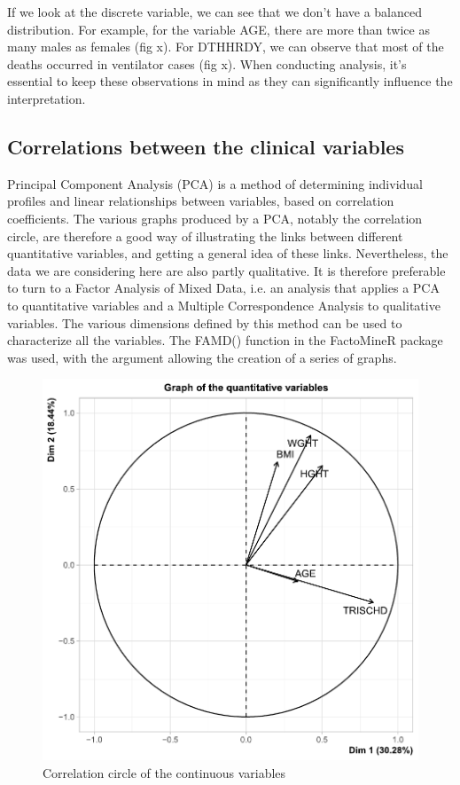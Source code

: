 \documentclass[a4paper, 11pt]{article}
\begin{document}
\begin{multicols}{2}
If we look at the discrete variable, we can see that we don't have a balanced distribution. For example, for the variable AGE, there are more than twice as many males as females (fig x). For DTHHRDY, we can observe that most of the deaths occurred in ventilator cases (fig x). When conducting analysis, it's essential to keep these observations in mind as they can significantly influence the interpretation. 

\subsection{Correlations between the clinical variables}

Principal Component Analysis (PCA) is a method of determining individual profiles and linear relationships between variables, based on correlation coefficients. The various graphs produced by a PCA, notably the correlation circle, are therefore a good way of illustrating the links between different quantitative variables, and getting a general idea of these links. Nevertheless, the data we are considering here are also partly qualitative. It is therefore preferable to turn to a Factor Analysis of Mixed Data, i.e. an analysis that applies a PCA to quantitative variables and a Multiple Correspondence Analysis to qualitative variables. The various dimensions defined by this method can be used to characterize all the variables. The FAMD() function in the FactoMineR package was used, with the argument allowing the creation of a series of graphs.

\begin{figure}[H]
	\centering
	\includegraphics[width=\columnwidth]{figures/clinical_correlation_plots/all_quant_Dim2}
	\caption{Correlation circle of the continuous variables}
	\label{fig:corCircle}
\end{figure}


\end{multicols}
\end{document}
